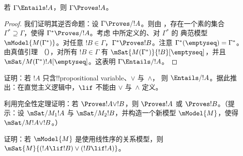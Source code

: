 \documentclass[../../../include/open-logic-section]{subfiles}
\begin{document}


\begin{thm}
  若 $\Gamma \Entails !A$，则 $\Gamma \Proves !A$。
\end{thm}

\begin{proof}
  我们证明其逆否命题：设 $\Gamma \Proves/ !A$。则由
  ，存在一个素的集合~$\Gamma^*
  \supseteq \Gamma$，使得 $\Gamma^* \Proves/ !A$。考虑
   中所定义的、对 $\Gamma^*$ 的
  典范模型~$\mModel{M(\Gamma^*)}$。对任意 $!B \in \Gamma$，$\Gamma^*
  \Proves !B$。注意 $\Gamma^*(\emptyseq) = \Gamma^*$。由真值引理
  （），对所有 $!B \in \Gamma$ 有
  $\mSat{M(\Gamma^*)}{!B}[\emptyseq]$，并且
  $\mSat/{M(\Gamma^*)}{!A}[\emptyseq]$。这表明 $\Gamma
  \Entails/ !A$。
\end{proof}

\begin{prob}
  证明：若 $!A$ 只含!!{propositional variable}、$\lor$ 与~$\land$，
  则 $\Entails/ !A$。据此推出：在直觉主义逻辑中，$\lif$ 不能由
  $\lor$ 与~$\land$ 定义。
\end{prob}

\begin{prob}
  利用完全性定理证明：若 $\Proves !A \lor !B$，则 $\Proves !A$ 或
  $\Proves !B$。（提示：设 $\mSat/{M_1}{!A}$ 与
  $\mSat/{M_2}{!B}$，并构造一个新模型 $\mModel{M}$，使得
  $\mSat/{M}{!A \lor !B}$。）
\end{prob}

\begin{prob}
  证明：若 $\mModel{M}$ 是使用线性序的关系模型，则
  $\mSat{M}{(!A \lif !B)\lor(!B \lif !A)}$。
\end{prob}
\end{document}
